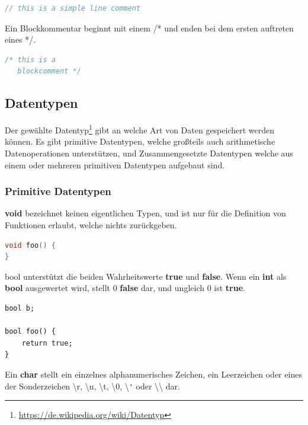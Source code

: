 \begin{lstlisting}[language=C]
// this is a simple line comment
\end{lstlisting}


Ein Blockkommentar beginnt mit einem /* und enden bei dem ersten auftreten eines */.

\begin{lstlisting}[language=C]
/* this is a
   blockcomment */
\end{lstlisting}

\subsection{Datentypen}

Der gew\"ahlte Datentyp\footnote{\url{https://de.wikipedia.org/wiki/Datentyp}} gibt an welche Art von Daten gespeichert werden k\"onnen. Es gibt primitive Datentypen, welche gro\ss{}teils auch arithmetische Datenoperationen unterst\"utzen, und Zusammengesetzte Datentypen welche aus einem oder mehreren primitiven Datentypen aufgebaut sind.

\subsubsection{Primitive Datentypen}


\textbf{void} bezeichnet keinen eigentlichen Typen, und ist nur f\"ur die Definition von Funktionen erlaubt, welche nichts zur\"uckgeben.

\begin{lstlisting}[language=C]
void foo() {
}
\end{lstlisting}


bool unterst\"utzt die beiden Wahrheitswerte \textbf{true} und \textbf{false}. Wenn ein \textbf{int} als \textbf{bool} ausgewertet wird, stellt 0 \textbf{false} dar, und ungleich 0 ist \textbf{true}.

\begin{lstlisting}[language=CMM]
bool b;

bool foo() {
	return true;
}
\end{lstlisting}


Ein \textbf{char} stellt ein einzelnes alphanumerisches Zeichen, ein Leerzeichen oder eines der Sonderzeichen \textbackslash{}r, \textbackslash{}n, \textbackslash{}t, \textbackslash{}0, \textbackslash{}\verb+'+ oder \textbackslash{}\textbackslash{} dar.

